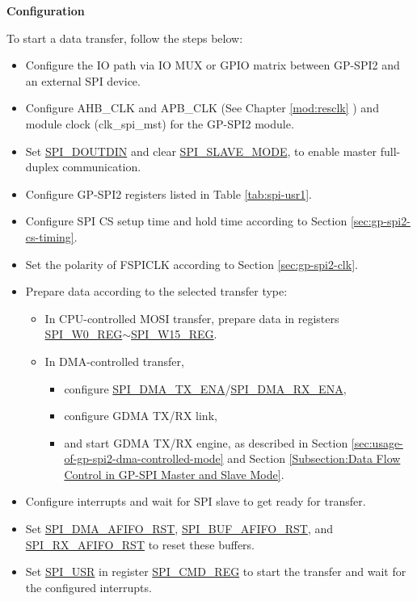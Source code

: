 \documentclass[main\_\_EN.tex]{subfiles}
\begin{document}
\textbf{Configuration}

To start a data transfer, follow the steps below:
\begin{itemize}
    \item Configure the IO path via IO MUX or GPIO matrix between GP-SPI2 and an external SPI device.
    \item Configure AHB\_CLK and APB\_CLK (See Chapter \ref{mod:resclk} \textit{}) and module clock (clk\_spi\_mst) for the GP-SPI2 module.
    \item Set \hyperref[fielddesc:SPIDOUTDIN]{SPI\_DOUTDIN} and clear \hyperref[fielddesc:SPISLAVEMODE]{SPI\_SLAVE\_MODE}, to enable master full-duplex communication.
    \item Configure GP-SPI2 registers listed in Table \ref{tab:spi-usr1}.
    \item Configure SPI CS setup time and hold time according to Section \ref{sec:gp-spi2-cs-timing}.
    \item Set the polarity of FSPICLK according to Section \ref{sec:gp-spi2-clk}. 
    \item Prepare data according to the selected transfer type:
    \begin{itemize}
        \item In CPU-controlled MOSI transfer, prepare data in registers \hyperref[regdesc:SPIW0REG]{SPI\_W0\_REG}$\sim$\hyperref[regdesc:SPIW15REG]{SPI\_W15\_REG}.
        \item In DMA-controlled transfer,
        \begin{itemize}
            \item configure \hyperref[fielddesc:SPIDMATXENA]{SPI\_DMA\_TX\_ENA}/\hyperref[fielddesc:SPIDMARXENA]{SPI\_DMA\_RX\_ENA},
            \item configure GDMA TX/RX link,
            \item and start GDMA TX/RX engine, as described in Section \ref{sec:usage-of-gp-spi2-dma-controlled-mode} and Section \ref{Subsection:Data Flow Control in GP-SPI Master and Slave Mode}.
        \end{itemize}
    \end{itemize}
    \item Configure interrupts and wait for SPI slave to get ready for transfer.
    \item Set \hyperref[fielddesc:SPIDMAAFIFORST]{SPI\_DMA\_AFIFO\_RST}, \hyperref[fielddesc:SPIBUFAFIFORST]{SPI\_BUF\_AFIFO\_RST}, and \hyperref[fielddesc:SPIRXAFIFORST]{SPI\_RX\_AFIFO\_RST} to reset these buffers.
    \item Set \hyperref[fielddesc:SPIUSR]{SPI\_USR} in register \hyperref[regdesc:SPICMDREG]{SPI\_CMD\_REG} to start the transfer and wait for the configured interrupts.
\end{itemize}
\end{document}

